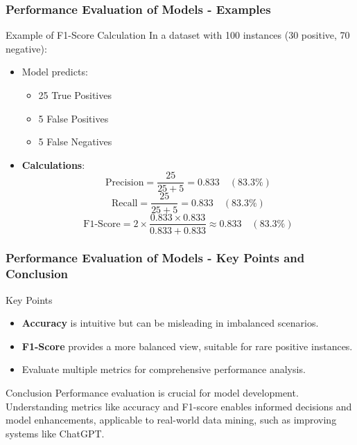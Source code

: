 \documentclass[aspectratio=169]{beamer}
\begin{document}
\begin{frame}[fragile]
    \frametitle{Performance Evaluation of Models - Examples}
    \begin{block}{Example of F1-Score Calculation}
        In a dataset with 100 instances (30 positive, 70 negative):
        
        \begin{itemize}
            \item Model predicts:
                \begin{itemize}
                    \item 25 True Positives
                    \item 5 False Positives
                    \item 5 False Negatives
                \end{itemize}

            \item \textbf{Calculations}:
                \begin{equation}
                \text{Precision} = \frac{25}{25 + 5} = 0.833 \quad (83.3\%)
                \end{equation}
                \begin{equation}
                \text{Recall} = \frac{25}{25 + 5} = 0.833 \quad (83.3\%)
                \end{equation}
                \begin{equation}
                \text{F1-Score} = 2 \times \frac{0.833 \times 0.833}{0.833 + 0.833} \approx 0.833 \quad (83.3\%)
                \end{equation}
        \end{itemize}
    \end{block}
\end{frame}

\begin{frame}[fragile]
    \frametitle{Performance Evaluation of Models - Key Points and Conclusion}
    \begin{block}{Key Points}
        \begin{itemize}
            \item \textbf{Accuracy} is intuitive but can be misleading in imbalanced scenarios.
            \item \textbf{F1-Score} provides a more balanced view, suitable for rare positive instances.
            \item Evaluate multiple metrics for comprehensive performance analysis.
        \end{itemize}
    \end{block}
    
    \begin{block}{Conclusion}
        Performance evaluation is crucial for model development. Understanding metrics like accuracy and F1-score enables informed decisions and model enhancements, applicable to real-world data mining, such as improving systems like ChatGPT.
    \end{block}
\end{frame}
\end{document}

